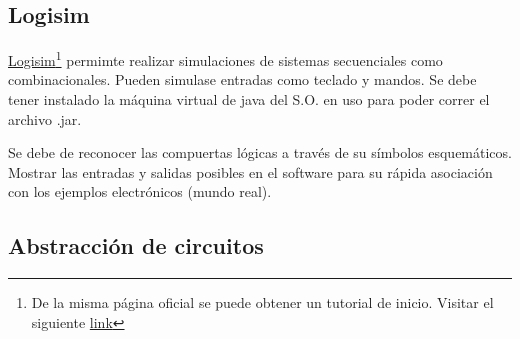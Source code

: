 \documentclass{article}
\begin{document}
\subsection{Logisim}

\href{http://www.cburch.com/logisim/index_es.html}{Logisim}\footnote{De la
		misma página oficial se puede obtener un tutorial de inicio. Visitar
		el siguiente \href{http://www.cburch.com/logisim/docs/2.1.0-es/guide/tutorial/index.html}{link}} permimte 
realizar simulaciones de sistemas secuenciales como 
combinacionales. Pueden simulase entradas  como teclado y 
mandos. Se debe tener instalado la máquina virtual de java del S.O. en uso
para poder correr el archivo .jar.

Se debe de reconocer las compuertas lógicas a través de su símbolos
esquemáticos. Mostrar las entradas y salidas posibles en el software para
su rápida asociación con los ejemplos electrónicos (mundo real).

\subsection{Abstracción de circuitos}
\end{document}
